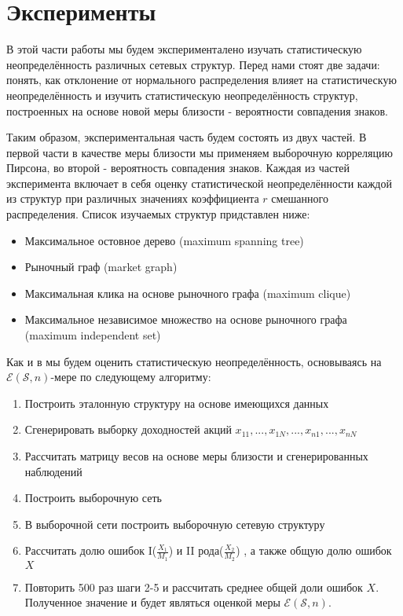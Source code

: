 \section{Эксперименты}

В этой части работы мы будем эксперименталено изучать статистическую неопределённость различных сетевых структур. Перед нами стоят две задачи: понять, как отклонение от нормального распределения влияет на статистическую неопределённость и изучить статистическую неопределённость структур, построенных на основе новой меры близости - вероятности совпадения знаков.

Таким образом, экспериментальная часть будем состоять из двух частей. В первой части в качестве меры близости мы применяем выборочную корреляцию Пирсона, во второй - вероятность совпадения знаков. Каждая из частей эксперимента включает в себя оценку статистической неопределённости каждой из структур  при различных значениях коэффициента $r$ смешанного распределения. 
Список изучаемых структур придставлен ниже:
\begin{itemize}
	\item Максимальное остовное дерево (maximum spanning tree)
	\item Рыночный граф (market graph)
	\item Максимальная клика на основе рыночного графа (maximum clique)
	\item Максимальное независимое множество на основе рыночного графа (maximum independent set)
\end{itemize}


Как и в \cite{measures} мы будем оценить статистическую неопределённость, основываясь на $\mathcal{E}(\mathcal{S},n)$-мере по следующему алгоритму: 
\begin{enumerate}
	\item Построить эталонную структуру на основе имеющихся данных
	\item Сгенерировать выборку доходностей акций $x_{1 1}, ..., x_{1 N}, ..., x_{n 1}, ..., x_{n N}$
	\item Рассчитать матрицу весов на основе меры близости и сгенерированных наблюдений
	\item Построить выборочную сеть
	\item В выборочной сети построить выборочную сетевую структуру
	\item Рассчитать долю ошибок I($\frac{X_1}{M_1}$) и II рода($\frac{X_2}{M_2}$) , а также общую долю ошибок $X$
	\item Повторить 500 раз шаги 2-5 и рассчитать среднее общей доли ошибок $X$. Полученное значение и будет являться оценкой меры $\mathcal{E}(\mathcal{S},n)$.
\end{enumerate}

